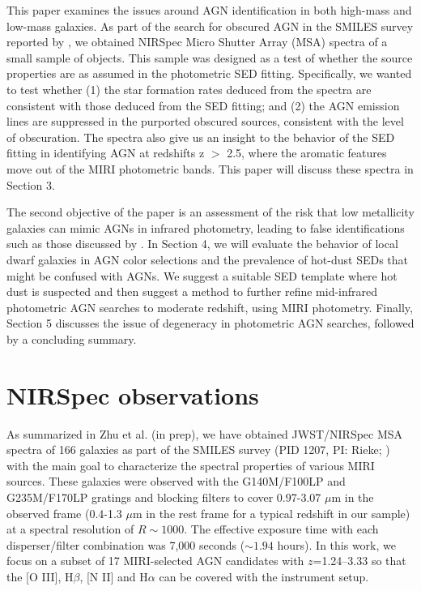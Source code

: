 \documentclass[twocolumn]{aastex63}
\begin{document}
This paper examines the issues around AGN identification in both high-mass and low-mass galaxies. As part of the search for obscured AGN in the SMILES survey  reported by \citet{Lyu2024}, we obtained NIRSpec Micro Shutter Array (MSA) \citep{Jakobsen2022} spectra of a small sample of objects. This sample was designed as a test of whether the source properties are as assumed in the photometric SED fitting. Specifically, we wanted to test whether 
(1)  the star formation rates deduced from the spectra are consistent with those deduced from the SED fitting; and (2) the AGN emission lines are suppressed in the purported obscured sources, consistent with the level of obscuration. The spectra also give us an insight to the behavior of the SED fitting in identifying AGN at redshifts z $>$ 2.5, where the aromatic features move out of the MIRI photometric bands. This paper will discuss these spectra in Section 3. 

The second objective of the paper is an  assessment of the risk that low metallicity galaxies can mimic AGNs in infrared photometry, leading to false identifications such as those discussed by \citet{Hainline2016}. In Section 4, we will  evaluate the behavior of local dwarf galaxies in AGN color selections and the prevalence of hot-dust SEDs that might be confused with AGNs. We suggest  a suitable SED template where hot dust is suspected and  then suggest a method to further refine mid-infrared photometric AGN searches to  moderate redshift, using MIRI photometry. Finally, Section 5 discusses the issue of degeneracy in photometric AGN searches, followed by a concluding summary. 

\section{NIRSpec observations} 

As summarized in Zhu et al. (in prep), we have obtained JWST/NIRSpec MSA spectra of 166 galaxies as part of the SMILES survey (PID 1207, PI: Rieke; \citealt{Alberts2024,Rieke2024}) with the main goal to characterize the spectral properties of various MIRI sources. These galaxies were observed with the G140M/F100LP and G235M/F170LP gratings and blocking filters to cover 0.97-3.07 $\mu$m in the observed frame (0.4-1.3 $\mu$m in the rest frame for a typical redshift in our sample) at a spectral resolution of $R\sim 1000$. The effective exposure time with each disperser/filter combination was 7,000 seconds ($\sim 1.94$ hours). In this work, we focus on a subset of 17 MIRI-selected AGN candidates with $z$=1.24--3.33 so that the [O III], H$\beta$, [N II] and H$\alpha$ can be covered with the instrument setup.   
\end{document}
